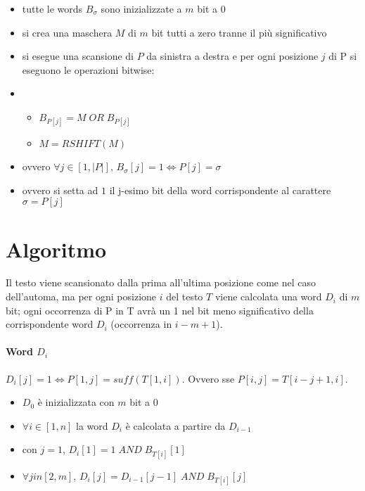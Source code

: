 \begin{itemize}
    \item tutte le words $B_\sigma$ sono inizializzate a $m$ bit a 0
    \item si crea una maschera $M$ di $m$ bit tutti a zero tranne il pi\`u significativo
    \item si esegue una scansione di $P$ da sinistra a destra e per ogni posizione $j$ di P si eseguono le operazioni bitwise:
    \item \begin{itemize}
        \item $B_{P[j]} = M \; OR \; B_{P[j]}$
        \item $M = RSHIFT(M)$
    \end{itemize}
    \item ovvero $\forall j \in [1, |P|]$, $B_\sigma[j] = 1 \Leftrightarrow P[j] = \sigma$
    \item ovvero si setta ad $1$ il j-esimo bit della word corrispondente al carattere $\sigma = P[j]$
\end{itemize}


\section{Algoritmo}

Il testo viene scansionato dalla prima all'ultima posizione come nel caso dell'automa, ma per ogni posizione $i$ del testo $T$ viene calcolata una word $D_i$ di $m$ bit; ogni occorrenza di P in T avr\`a un 1 nel bit meno significativo della corrispondente word $D_i$ (occorrenza in $i-m+1$).

\paragraph{Word $D_i$} $D_i[j] = 1 \Leftrightarrow P[1,j] = suff(T[1,i])$. Ovvero sse $P[i,j] = T[i-j+1, i]$.


\begin{itemize}
    \item $D_0$ \`e inizializzata con $m$ bit a 0
    \item $\forall i \in [1,n]$ la word $D_i$ \`e calcolata a partire da $D_{i-1}$
    \item con $j = 1$, $D_{i}[1] = 1 \; AND \; B_{T[i]}[1]$
    \item $\forall j in [2,m]$, $D_i[j] = D_{i-1}[j-1] \; AND \; B_{T[i]}[j]$
\end{itemize}

